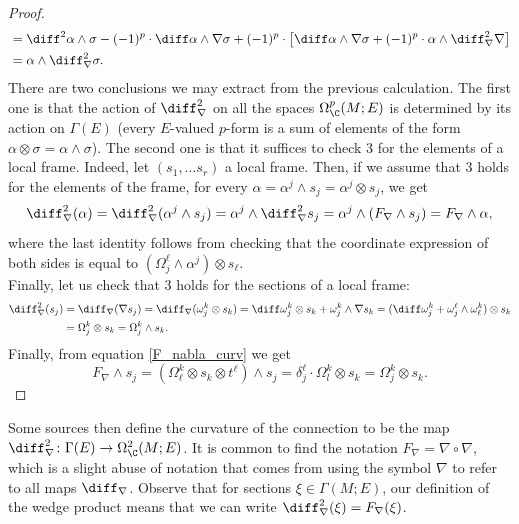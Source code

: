 \begin{proof}
\begin{align*}
        &= \diff^2 \alpha \wedge \sigma -(-1)^p \cdot  \diff \alpha \wedge \nabla \sigma+(-1)^p \cdot \big[ \diff \alpha \wedge \nabla \sigma +(-1)^p \cdot  \alpha \wedge \diff_\nabla^2 \nabla\big] \\
        & =  \alpha \wedge \diff_\nabla^2 \sigma.
    \end{align*}
    There are two conclusions we may extract from the previous calculation. The first one is that the action of \(\diff_\nabla^2\) on all the spaces \(\Omega_\C^p(M;E)\) is determined by its action on \(\Gamma(E)\) (every \(E\)-valued \(p\)-form is a sum of elements of the form \(\alpha \otimes \sigma=\alpha \wedge \sigma\)). The second one is that it suffices to check 3 for the elements of a local frame. Indeed, let \((s_1, \ldots s_r)\) a local frame. Then, if we assume that 3 holds for the elements of the frame, for every \(\alpha=\alpha^j \wedge s_j=\alpha^j \otimes s_j\), we get
    \[
    \diff_\nabla^2(\alpha) = \diff_\nabla^2(\alpha^j \wedge s_j) = \alpha^j \wedge \diff_\nabla^2 s_j =\alpha^j \wedge (F_\nabla \wedge s_j)= F_\nabla \wedge \alpha,
    \]
    where the last identity follows from checking that the coordinate expression of both sides is equal to \((\Omega^\ell_j \wedge \alpha^j)\otimes s_\ell\). \\

    Finally, let us check that 3 holds for the sections of a local frame:
    \begin{align*}
        \diff_\nabla^2(s_j) & = \diff_\nabla(\nabla s_j)=\diff_\nabla (\omega^k_j \otimes s_k) =\diff \omega^k_j \otimes s_k + \omega ^k_j \wedge \nabla s_k=(\diff \omega^k_j+\omega_j^\ell \wedge \omega^k_\ell) \otimes s_k \\
        & = \Omega^k_j \otimes s_k = \Omega_j^k \wedge s_k.
    \end{align*}
    Finally, from equation \eqref{F_nabla_curv} we get
    \[
    F_\nabla \wedge s_j = (\Omega^k_\ell \otimes s_k \otimes t^\ell) \wedge s_j = \delta^\ell_j \cdot \Omega^k_l \otimes s_k = \Omega^k_j \otimes s_k.
    \]
\end{proof}

Some sources then define the curvature of the connection to be the map \(\diff_\nabla^2 \colon \Gamma(E) \to \Omega_\C^2(M;E)\). It is common to find the notation \(F_\nabla=\nabla \circ \nabla\), which is a slight abuse of notation that comes from using the symbol \(\nabla\) to refer to all maps \(\diff_\nabla\). Observe that for sections \(\xi \in \Gamma(M;E)\), our definition of the wedge product means that we can write \(\diff_\nabla^2(\xi)=F_\nabla(\xi)\). \\

